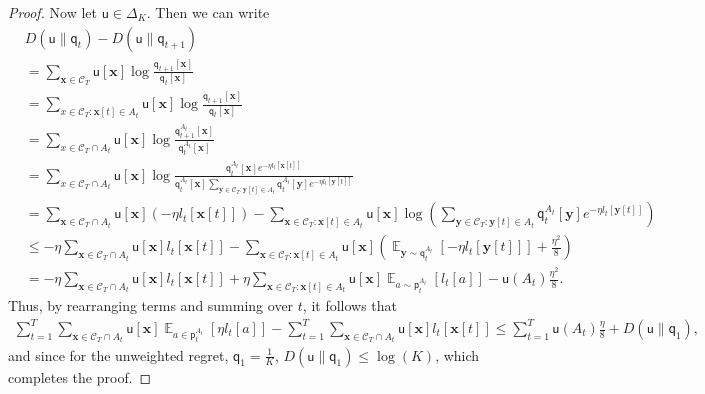 \documentclass{article}
\DeclareMathOperator*{\E}{\mathbb E}
\newcommand{\sC}{\mathscr C}
\newcommand{\bx}{{\mathbf x}}
\newcommand{\by}{{\mathbf y}}
\newcommand{\sfp}{{\mathsf p}}
\newcommand{\sfq}{{\mathsf q}}
\newcommand{\sfu}{{\mathsf u}}
\begin{document}
\begin{proof}
  Now let $\sfu \in \Delta_K$. Then we can write
  \begin{align*}
    &D(\sfu \| \sfq_t) - D(\sfu \| \sfq_{t+1})\\ 
    &= \sum_{\bx \in \sC_T} \sfu[\bx] \log \frac{\sfq_{t+1}[\bx]}{\sfq_t[\bx]} \\
    &= \sum_{x \in \sC_T \colon \bx[t] \in A_t} \sfu[\bx] \log\frac{\sfq_{t+1}[\bx]}{\sfq_t[\bx]} \\
    &= \sum_{x \in \sC_T \cap A_t} \sfu[\bx] \log\frac{\sfq_{t+1}^{A_t}[\bx]}{\sfq_t^{A_t}[\bx]} \\
    &= \sum_{x \in \sC_T \cap A_t} \sfu[\bx] \log\frac{\sfq_{t}^{A_t}[\bx]e^{-\eta l_t[\bx[t]]}}{\sfq_t^{A_t}[\bx] \sum_{\by \in \sC_T \colon \by[t] \in A_t} \sfq_{t}^{A_t}[\by]e^{-\eta l_t[\by[t]]}} \\
    &= \sum_{\bx \in \sC_T \cap A_t} \sfu[\bx] (-\eta l_t[\bx[t]]) - \sum_{\bx \in \sC_T \colon \bx[t] \in A_t} \sfu[\bx] \log\left( \sum_{\by \in \sC_T \colon \by[t] \in A_t} \sfq_{t}^{A_t}[\by]e^{-\eta l_t[\by[t]]}\right) \\
    &\leq -\eta \sum_{\bx \in \sC_T \cap A_t} \sfu[\bx] l_t[\bx[t]] - \sum_{\bx \in \sC_T \colon \bx[t] \in A_t} \sfu[\bx] \left( \E_{\by \sim \sfq_t^{A_t}} [-\eta l_t[\by[t]]] + \frac{\eta^2}{8} \right) \\
    &= -\eta \sum_{\bx \in \sC_T \cap A_t} \sfu[\bx] l_t[\bx[t]]  + \eta \sum_{\bx \in \sC_T \colon \bx[t] \in A_t} \sfu[\bx] \E_{a \sim \sfp_t^{A_t}} [ l_t[a]]  -  \sfu(A_t) \frac{\eta^2}{8}.
  \end{align*}
  Thus, by rearranging terms and summing over $t$, it follows that
  \begin{align*}
    \sum_{t=1}^T \sum_{\bx \in \sC_T \cap A_t} \sfu[\bx] \E_{a \in \sfp_t^{A_t}} [\eta l_t[a]] 
    - \sum_{t=1}^T \sum_{\bx \in \sC_T \cap A_t} \sfu[\bx] l_t[\bx[t]]   \leq 
    \sum_{t=1}^T \sfu(A_t) \frac{\eta}{8} + D(\sfu \| \sfq_1), 
  \end{align*}
  and since for the unweighted regret, $\sfq_1 = \frac{1}{K}$, $D(\sfu \| \sfq_1) \leq \log(K)$, which completes the proof.
\end{proof}
\end{document}
